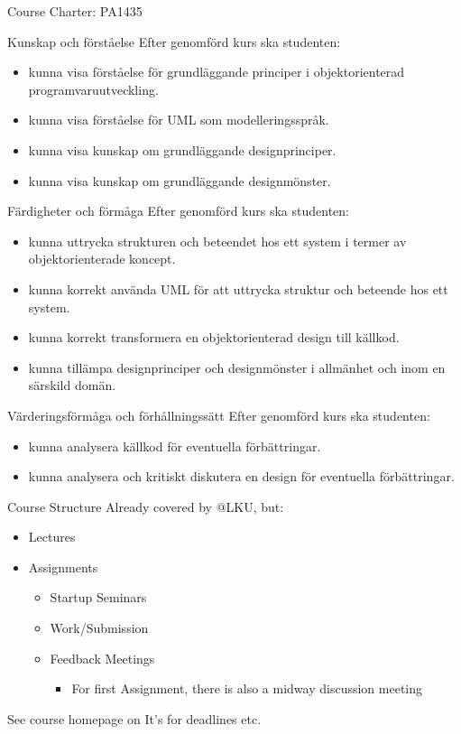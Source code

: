 \documentclass[10pt,t,a4paper]{beamer}
\begin{document}
\begin{frame}[shrink=15,label=sec-3]{Course Charter: PA1435}

\alert{Kunskap och förståelse} Efter genomförd kurs ska studenten:
\begin{itemize}
\item kunna visa förståelse för grundläggande principer i objektorienterad programvaruutveckling.
\item kunna visa förståelse för UML som modelleringsspråk.
\item kunna visa kunskap om grundläggande designprinciper.
\item kunna visa kunskap om grundläggande designmönster.
\end{itemize}

\alert{Färdigheter och förmåga} Efter genomförd kurs ska studenten:
\begin{itemize}
\item kunna uttrycka strukturen och beteendet hos ett system i termer av objektorienterade koncept.
\item kunna korrekt använda UML för att uttrycka struktur och beteende hos ett system.
\item kunna korrekt transformera en objektorienterad design till källkod.
\item kunna tillämpa designprinciper och designmönster i allmänhet och inom en särskild domän.
\end{itemize}

\alert{Värderingsförmåga och förhållningssätt} Efter genomförd kurs ska studenten:
\begin{itemize}
\item kunna analysera källkod för eventuella förbättringar.
\item kunna analysera och kritiskt diskutera en design för eventuella förbättringar.
\end{itemize}
\end{frame}
\begin{frame}[label=sec-4]{Course Structure}
Already covered by @LKU, but:
\begin{itemize}
\item Lectures
\item Assignments
\begin{itemize}
\item Startup Seminars
\item Work/Submission
\item Feedback Meetings
\begin{itemize}
\item For first Assignment, there is also a midway discussion meeting
\end{itemize}
\end{itemize}
\end{itemize}

See course homepage on It's for deadlines etc.        
\end{frame}
\end{document}
